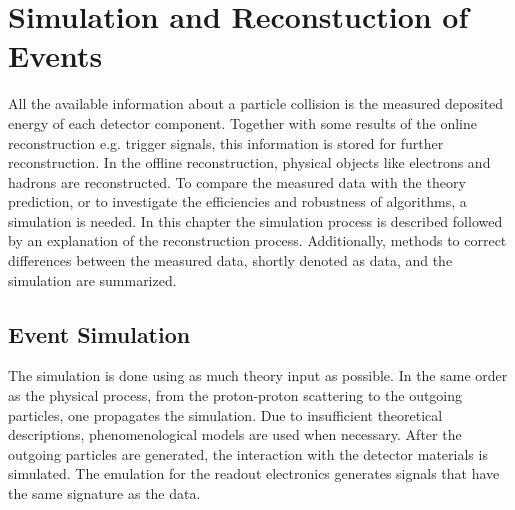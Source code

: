 \chapter{Simulation and Reconstuction of Events}
\label{ch:sim_reco}


All the available information about a particle collision is the measured deposited energy of each detector component. Together with some results of the online reconstruction e.g. trigger signals, this information is stored for further reconstruction. In the offline reconstruction, physical objects like electrons and hadrons are reconstructed. To compare the measured data with the theory prediction, or to investigate the efficiencies and robustness of algorithms, a simulation is needed. In this chapter the simulation process is described followed by an explanation of the reconstruction process. Additionally, methods to correct differences between the measured data, shortly denoted as data, and the simulation are summarized. 


\section{Event Simulation}
The simulation is done using as much theory input as possible. In the same order as the physical process, from the proton-proton scattering to the outgoing particles, one propagates the simulation. Due to insufficient theoretical descriptions, phenomenological models are used when necessary. After the outgoing particles are generated, the interaction with the detector materials is simulated. The emulation for the readout electronics generates signals that have the same signature as the data. 

